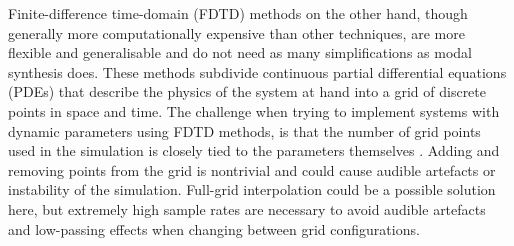 Finite-difference time-domain (FDTD) methods on the other hand, though generally more computationally expensive than other techniques, are more flexible and generalisable and do not need as many simplifications as modal synthesis does. %
These methods subdivide continuous partial differential equations (PDEs) that describe the physics of the system at hand into a grid of discrete points in space and time.  The challenge when trying to implement systems with dynamic parameters using FDTD methods, is that the number of grid points used in the simulation is closely tied to the parameters themselves . Adding and removing points from the grid is nontrivial and could cause audible artefacts or instability of the simulation. Full-grid interpolation \cite[Ch. 5]{bilbao2009} could be a possible solution here, but extremely high sample rates are necessary to avoid audible artefacts and low-passing effects when changing between grid configurations. 

%

